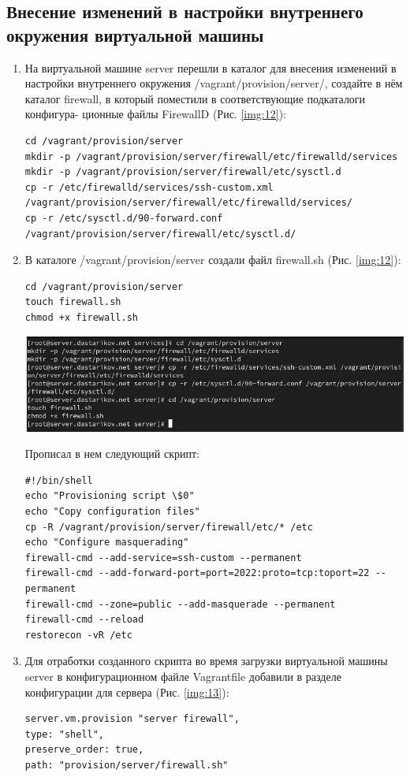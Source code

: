 \subsection{Внесение изменений в настройки внутреннего окружения виртуальной машины}
\begin{enumerate}
\item На виртуальной машине server перешли в каталог для внесения изменений
в настройки внутреннего окружения /vagrant/provision/server/, создайте в нём
каталог firewall, в который поместили в соответствующие подкаталоги конфигура-
ционные файлы FirewallD (Рис. \ref{img:12}):
    \begin{verbatim}
cd /vagrant/provision/server
mkdir -p /vagrant/provision/server/firewall/etc/firewalld/services
mkdir -p /vagrant/provision/server/firewall/etc/sysctl.d
cp -r /etc/firewalld/services/ssh-custom.xml /vagrant/provision/server/firewall/etc/firewalld/services/
cp -r /etc/sysctl.d/90-forward.conf /vagrant/provision/server/firewall/etc/sysctl.d/
    \end{verbatim}
\item В каталоге /vagrant/provision/server создали файл firewall.sh (Рис. \ref{img:12}):
    \begin{verbatim}
cd /vagrant/provision/server
touch firewall.sh
chmod +x firewall.sh
    \end{verbatim}

\begin{center}
    \centering
    \includegraphics[width=\textwidth]{../images/image12.png}
    \label{img:12}
\end{center}

    Прописал в нем следующий скрипт:
    \begin{verbatim}
#!/bin/shell
echo "Provisioning script \$0"
echo "Copy configuration files"
cp -R /vagrant/provision/server/firewall/etc/* /etc
echo "Configure masquerading"
firewall-cmd --add-service=ssh-custom --permanent
firewall-cmd --add-forward-port=port=2022:proto=tcp:toport=22 --permanent
firewall-cmd --zone=public --add-masquerade --permanent
firewall-cmd --reload
restorecon -vR /etc
    \end{verbatim}
\item Для отработки созданного скрипта во время загрузки виртуальной машины server в конфигурационном файле Vagrantfile добавили в разделе конфигурации для сервера (Рис. \ref{img:13}):
    \begin{verbatim}
server.vm.provision "server firewall",
type: "shell",
preserve_order: true,
path: "provision/server/firewall.sh"
    \end{verbatim}


\end{enumerate}
